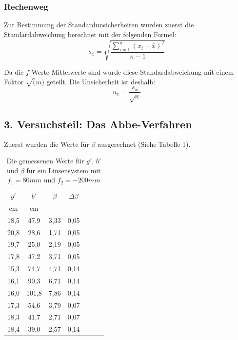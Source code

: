 \documentclass[11pt,a4paper]{article}
\begin{document}
\begin{tcolorbox}[colback=white]
	\subsubsection{Rechenweg}
	Zur Bestimmung der Standardunsicherheiten wurden zuerst die Standardabweichung berechnet mit der folgenden Formel:
	$$s_x = \sqrt{\frac{\sum_{i=1}^{n}(x_i-\bar{x})^2}{n-1}} $$
	
	Da die $f$ Werte Mittelwerte sind wurde diese Standardabweichung mit einem Faktor $\sqrt(m)$ geteilt. Die Unsicherheit ist deshalb:
	$$u_x = \frac{s_x}{\sqrt{n}}$$
\end{tcolorbox}

\subsection{3. Versuchsteil: Das Abbe-Verfahren}
Zuerst wurden die Werte für $\beta$ ausgerechnet (Siehe Tabelle 1).



\begin{table}[h]
	\centering
	\begin{tabular*}{0.50\textwidth}{@{\extracolsep{\fill}}cc|ccccc}
		\toprule
		$g'$ & $b'$ & $\beta$ & $\Delta \beta$   \\
		cm & cm& &\\
		18,5&47,9&3,33&0,05\\
		20,8&28,6&1,71&0,05\\
		19,7&25,0&2,19&0,05\\
		17,8&47,2&3,71&0,05\\
		15,3&74,7&4,71&0,14\\
		16,1&90,3&6,71&0,14\\
		16,0&101,8&7,86&0,14\\
		17,3&54,6&3,79&0,07\\
		18,3&41,7&2,71&0,07\\
		18,4&39,0&2,57&0,14\\
		\bottomrule
	\end{tabular*}
	\caption{Die gemessenen Werte für $g'$, $b'$ und $\beta$ für ein Linsensystem mit $f_1 = 80mm$ und $f_2 = -200mm$}
\end{table}
\end{document}
